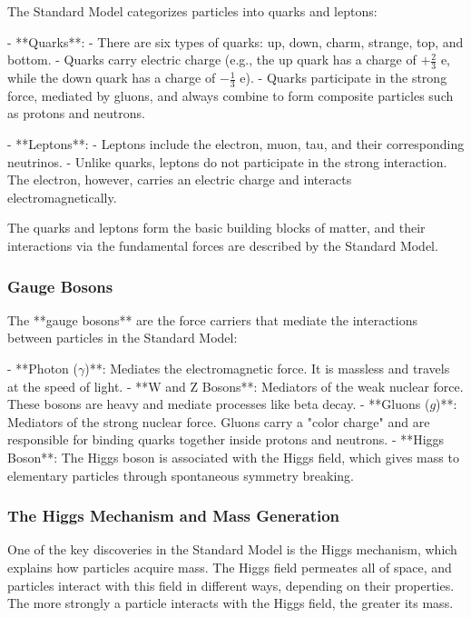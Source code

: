 \documentclass{article}
\begin{document}
The Standard Model categorizes particles into quarks and leptons:

- **Quarks**: 
  - There are six types of quarks: up, down, charm, strange, top, and bottom.
  - Quarks carry electric charge (e.g., the up quark has a charge of \( +\frac{2}{3} \) e, while the down quark has a charge of \( -\frac{1}{3} \) e).
  - Quarks participate in the strong force, mediated by gluons, and always combine to form composite particles such as protons and neutrons.

- **Leptons**:
  - Leptons include the electron, muon, tau, and their corresponding neutrinos.
  - Unlike quarks, leptons do not participate in the strong interaction. The electron, however, carries an electric charge and interacts electromagnetically.

The quarks and leptons form the basic building blocks of matter, and their interactions via the fundamental forces are described by the Standard Model.

\subsubsection*{Gauge Bosons}

The **gauge bosons** are the force carriers that mediate the interactions between particles in the Standard Model:

- **Photon (\( \gamma \))**: Mediates the electromagnetic force. It is massless and travels at the speed of light.
- **W and Z Bosons**: Mediators of the weak nuclear force. These bosons are heavy and mediate processes like beta decay.
- **Gluons (\( g \))**: Mediators of the strong nuclear force. Gluons carry a "color charge" and are responsible for binding quarks together inside protons and neutrons.
- **Higgs Boson**: The Higgs boson is associated with the Higgs field, which gives mass to elementary particles through spontaneous symmetry breaking.

\subsubsection*{The Higgs Mechanism and Mass Generation}

One of the key discoveries in the Standard Model is the Higgs mechanism, which explains how particles acquire mass. The Higgs field permeates all of space, and particles interact with this field in different ways, depending on their properties. The more strongly a particle interacts with the Higgs field, the greater its mass.
\end{document}
